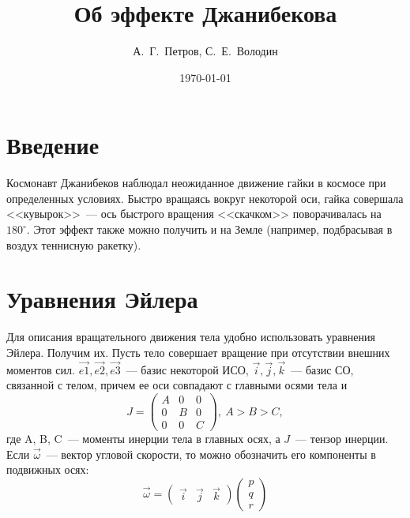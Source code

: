 \documentclass{article}
\title{Об эффекте Джанибекова}
\date{\today}
\author{А.~Г.~Петров, С.~Е.~Володин}
\newcommand{\degree}{^{\circ}}
\begin{document}
\maketitle
\section{Введение}
Космонавт Джанибеков наблюдал неожиданное движение гайки в космосе при определенных условиях. Быстро вращаясь вокруг некоторой оси, гайка совершала <<кувырок>>~--- ось быстрого вращения <<скачком>> поворачивалась на \begin{math} 180\degree \end{math}. Этот эффект также можно получить и на Земле (например, подбрасывая в воздух теннисную ракетку).


\section{Уравнения Эйлера}
Для описания вращательного движения тела удобно использовать уравнения Эйлера. Получим их.
Пусть тело совершает вращение при отсутствии внешних моментов сил.
\begin{math}
\vec{e1}, \vec{e2}, \vec{e3}
\end{math}~--- базис некоторой ИСО,
\begin{math}
\vec{i}, \vec{j}, \vec{k}
\end{math}~--- базис СО, связанной с телом, причем ее оси совпадают с главными осями тела и
\begin{equation}
J=\left( \begin{array}{lcr} A & 0 & 0\\ 0 & B & 0\\ 0 & 0 & C \end{array} \right),\ A > B > C,
\end{equation}
где A, B, C~--- моменты инерции тела в главных осях, а \begin{math} J \end{math}~--- тензор инерции. Если \begin{math} \vec{\omega} \end{math}~--- вектор угловой скорости, то можно обозначить его компоненты в подвижных осях:
\begin{equation}
\vec{\omega}=
\left( \begin{array}{lcr} \vec{i} & \vec{j} & \vec{k} \end{array} \right)
\left( \begin{array}{lcr} p\\q\\r \end{array} \right)
\end{equation}
\end{document}
